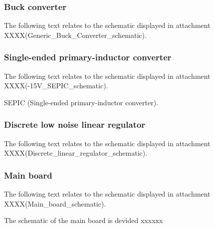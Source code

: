 \subsubsection{Buck converter}
The following text relates to the schematic displayed in attachment XXXX(Generic\_Buck\_Converter\_schematic).

\subsubsection{Single-ended primary-inductor converter}
The following text relates to the schematic displayed in attachment XXXX(-15V\_SEPIC\_schematic).

SEPIC (Single-ended primary-inductor converter).

\subsubsection{Discrete low noise linear regulator}
The following text relates to the schematic displayed in attachment XXXX(Discrete\_linear\_regulator\_schematic).

\subsubsection{Main board}
The following text relates to the schematic displayed in attachment XXXX(Main\_board\_schematic).

The schematic of the main board is devided xxxxxx